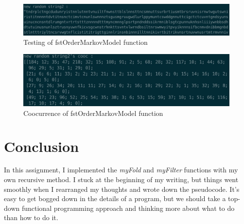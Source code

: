 \documentclass{article}
\begin{document}
\begin{figure}[htbp]
      \centering
      \includegraphics[width=\linewidth]{randomstring2}
      \caption{Testing of fstOrderMarkovModel function}
      \label{fig:randomstring2}
\end{figure}

\begin{figure}[htbp]
      \centering
      \includegraphics[width=\linewidth]{newrandomstring2cooc}
      \caption{Coocurrence of fstOrderMarkovModel function}
      \label{fig:newrandomstring2cooc}
\end{figure}

\section{Conclusion}

In this assignment, I implemented the \emph{myFold} and \emph{myFilter} functions with my own recursive method. I stuck at the beginning of my writing, but things went smoothly when I rearranged my thoughts and wrote down the pseudocode. It's easy to get bogged down in the details of a program, but we should take a top-down functional programming approach and thinking more about what to do than how to do it.






\end{document}
